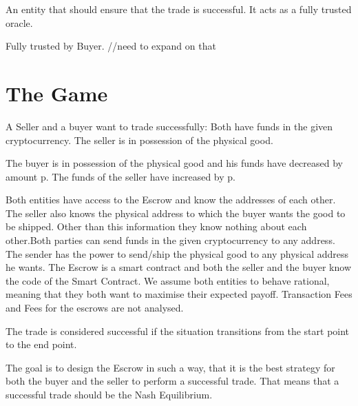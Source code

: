\documentclass{cacthesis}
\begin{document}
 An entity that should ensure that the trade is successful. It acts as a fully trusted oracle.

 Fully trusted by Buyer.  //need to expand on that

\section{The Game}

A Seller and a buyer want to trade successfully: Both have funds in the given cryptocurrency. The seller is in possession of the physical good.

The buyer is in possession of the physical good and his funds have decreased by amount p. The funds of the seller have increased by p.

Both entities have access to the Escrow and know the addresses of each other. The seller also knows the physical address to which the buyer wants the good to be shipped. Other than this information they know nothing about each other.\newline Both parties can send funds in the given cryptocurrency to any address. The sender has the power to send/ship the physical good to any physical address he wants. The Escrow is a smart contract and both the seller and the buyer know the code of the Smart Contract.\newline
We assume both entities to behave rational, meaning that they both want to maximise their expected payoff.\newline
Transaction Fees and Fees for the escrows are not analysed.



The trade is considered successful if the situation transitions from the start point to the end point.

The goal is to design the Escrow in such a way, that it is the best strategy for both the buyer and the seller to perform a successful trade. That means that a successful trade should be the Nash Equilibrium.

\end{document}
